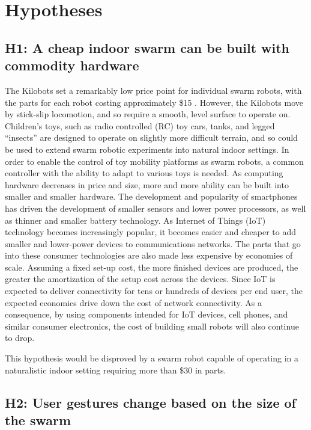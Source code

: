 \section{Hypotheses} \label{section:Hypotheses}

\subsection{H1: A cheap indoor swarm can be built with commodity hardware}

The Kilobots set a remarkably low price point for individual swarm robots, with the parts for each robot costing approximately \$15 \citep{rubenstein2014kilobot}. 
However, the Kilobots move by stick-slip locomotion, and so require a smooth, level surface to operate on. 
Children's toys, such as radio controlled (RC) toy cars, tanks, and legged ``insects'' are designed to operate on slightly more difficult terrain, and so could be used to extend swarm robotic experiments into natural indoor settings. 
In order to enable the control of toy mobility platforms as swarm robots, a common controller with the ability to adapt to various toys is needed.   
As computing hardware decreases in price and size, more and more ability can be built into smaller and smaller hardware. 
The development and popularity of smartphones has driven the development of smaller sensors and lower power processors, as well as thinner and smaller battery technology. 
As Internet of Things (IoT) technology becomes increasingly popular, it becomes easier and cheaper to add smaller and lower-power devices to communications networks. 
The parts that go into these consumer technologies are also made less expensive by economies of scale. 
Assuming a fixed set-up cost, the more finished devices are produced, the greater the amortization of the setup cost across the devices. 
Since IoT is expected to deliver connectivity for tens or hundreds of devices per end user, the expected economics drive down the cost of network connectivity.
As a consequence, by using components intended for IoT devices, cell phones, and similar consumer electronics, the cost of building small robots will also continue to drop.

This hypothesis would be disproved by a swarm robot capable of operating in a naturalistic indoor setting requiring more than \$30 in parts. 


\subsection{H2: User gestures change based on the size of the swarm}


